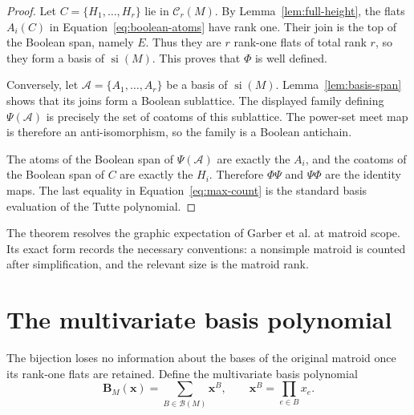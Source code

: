 \documentclass[11pt]{article}
\theoremstyle{definition}
\theoremstyle{remark}
\newcommand{\si}{\operatorname{si}}
\newcommand{\cB}{\mathcal B}
\newcommand{\cC}{\mathcal C}
\begin{document}
\begin{proof}
Let $C=\{H_1,\ldots,H_r\}$ lie in $\cC_r(M)$.  By
Lemma~\ref{lem:full-height}, the flats $A_i(C)$ in
Equation~\eqref{eq:boolean-atoms} have rank one.  Their join is the top of
the Boolean span, namely $E$.  Thus they are $r$ rank-one flats of total rank
$r$, so they form a basis of $\si(M)$.  This proves that $\Phi$ is well
defined.

Conversely, let $\mathcal A=\{A_1,\ldots,A_r\}$ be a basis of $\si(M)$.
Lemma~\ref{lem:basis-span} shows that its joins form a Boolean sublattice.
The displayed family defining $\Psi(\mathcal A)$ is precisely the set of
coatoms of this sublattice.  The power-set meet map is therefore an
anti-isomorphism, so the family is a Boolean antichain.

The atoms of the Boolean span of $\Psi(\mathcal A)$ are exactly the $A_i$,
and the coatoms of the Boolean span of $C$ are exactly the $H_i$.  Therefore
$\Phi\Psi$ and $\Psi\Phi$ are the identity maps.
The last equality in
Equation~\eqref{eq:max-count} is the standard basis evaluation of the Tutte
polynomial.
\end{proof}

The theorem resolves the graphic expectation of Garber et al. at matroid
scope.  Its exact form records the necessary conventions: a nonsimple matroid
is counted after simplification, and the relevant size is the matroid rank.

\section{The multivariate basis polynomial}

The bijection loses no information about the bases of the original matroid
once its rank-one flats are retained.  Define the multivariate basis
polynomial
\[
 \mathbf B_M(\mathbf x)=\sum_{B\in\cB(M)}\mathbf x^B,
 \qquad \mathbf x^B=\prod_{e\in B}x_e.
\]
\end{document}
